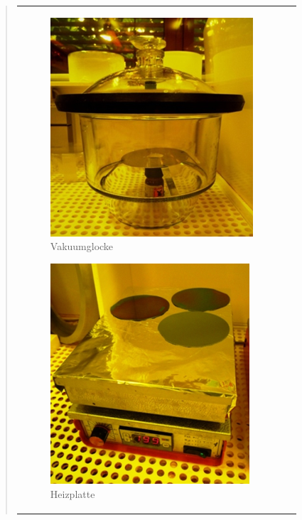 \begin{quote}
\begin{center}
\begin{tabular}{ll}
                \hspace{-14em}
                    \begin{minipage}{0.7\textwidth}
                        \begin{figure}[H]
                        \hspace{5em}
                            \includegraphics[scale=1.0, trim = 0cm 0cm 0cm
                            0cm, clip]{./HerstellungBilder/Vakuumglocke.png}
                            \caption{Vakuumglocke}
                           \label{fig:vakuumgl}
                        \end{figure}

                    \end{minipage}
                    \begin{minipage}{0.3\textwidth}

                        \begin{figure}[H]
                        \hspace{-3em}
                            \includegraphics[scale=1.0, trim = 0cm 0cm 0cm
                            0cm, clip]
                            {./HerstellungBilder/Heizplatte.png}
                            \caption{Heizplatte}
                           \label{fig:heizpl}
                        \end{figure}
                    \vspace{-1.5em}


\end{minipage}
\end{tabular}
\end{center}
\end{quote}
